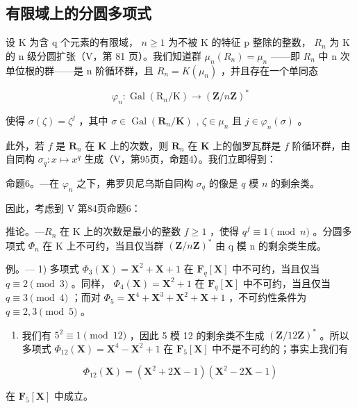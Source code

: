 \subsection{有限域上的分圆多项式}

设 K 为含 q 个元素的有限域， \(n \geqslant 1\) 为不被 K 的特征 p 整除的整数， \(R_{n}\) 为 K 的 n 级分圆扩张（V，第 81 页）。我们知道群 \(\mu_{n}(R_{n}) = \mu_{n}\) ——即 \(R_{n}\) 中 n 次单位根的群——是 n 阶循环群，且 \(R_{n} = K(\mu_{n})\) ，并且存在一个单同态

\[
\varphi_ {n}: \operatorname{Gal} \left(\mathrm{R} _ {n} / \mathrm{K}\right)\rightarrow (\mathbf {Z} / n \mathbf {Z}) ^ {*}
\]

使得 \(\sigma(\zeta) = \zeta^j\) ，其中 \(\sigma \in \operatorname{Gal}(\mathbf{R}_n / \mathbf{K})\) , \(\zeta \in \mu_n\) 且 \(j \in \varphi_n(\sigma)\) 。

此外，若 \(f\) 是 \(\mathbf{R}_n\) 在 \(\mathbf{K}\) 上的次数，则 \(\mathbf{R}_n\) 在 \(\mathbf{K}\) 上的伽罗瓦群是 \(f\) 阶循环群，由自同构 \(\sigma_q: x \mapsto x^q\) 生成（V，第95页，命题4）。我们立即得到：

命题6。---在 \(\varphi_{n}\) 之下，弗罗贝尼乌斯自同构 \(\sigma_{q}\) 的像是 \(q\) 模 \(n\) 的剩余类。

因此，考虑到 V 第84页命题6：

推论。---\(R_{n}\) 在 K 上的次数是最小的整数 \(f \geqslant 1\) ，使得 \(q^{f} \equiv 1 \pmod{n}\) 。分圆多项式 \(\Phi_{n}\) 在 K 上不可约，当且仅当群 \((\mathbf{Z}/n\mathbf{Z})^{*}\) 由 q 模 n 的剩余类生成。

例。--- 1) 多项式 \(\Phi_3(\mathbf{X}) = \mathbf{X}^2 + \mathbf{X} + 1\) 在 \(\mathbf{F}_q[\mathbf{X}]\) 中不可约，当且仅当 \(q \equiv 2 \pmod{3}\) 。同样， \(\Phi_4(\mathbf{X}) = \mathbf{X}^2 + 1\) 在 \(\mathbf{F}_q[\mathbf{X}]\) 中不可约，当且仅当 \(q \equiv 3 \pmod{4}\) ；而对 \(\Phi_5 = \mathbf{X}^4 + \mathbf{X}^3 + \mathbf{X}^2 + \mathbf{X} + 1\) ，不可约性条件为 \(q \equiv 2, 3 \pmod{5}\) 。

\begin{enumerate}
\def\labelenumi{\arabic{enumi})}
\setcounter{enumi}{1}
\tightlist
\item
  我们有 \(5^2 \equiv 1 \pmod{12}\) ，因此 5 模 12 的剩余类不生成 \((\mathbf{Z}/12\mathbf{Z})^*\) 。所以多项式 \(\Phi_{12}(\mathbf{X}) = \mathbf{X}^4 - \mathbf{X}^2 + 1\) 在 \(\mathbf{F}_5[\mathbf{X}]\) 中不是不可约的；事实上我们有
\end{enumerate}

\[
\Phi_ {12} (\mathbf {X}) = \left(\mathbf {X} ^ {2} + 2 \mathbf {X} - 1\right) \left(\mathbf {X} ^ {2} - 2 \mathbf {X} - 1\right)
\]

在 \(\mathbf{F}_5[\mathbf{X}]\) 中成立。


